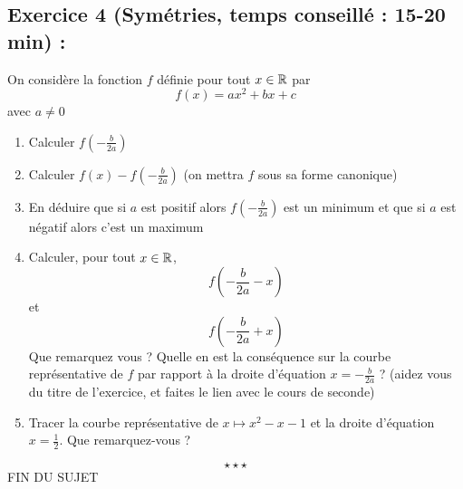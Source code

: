 \subsection*{Exercice 4 (Symétries, temps conseillé : 15-20 min) : }
On considère la fonction $f$ définie pour tout $x\in \mathbb{R}$ par 
$$f(x) = ax^2+bx+c$$
avec $a\neq 0$
\begin{enumerate}
\item Calculer $\displaystyle f\left(-\frac{b}{2a}\right)$
\item Calculer $f(x) - f\left(-\frac{b}{2a}\right)$ (on mettra $f$ sous sa forme canonique)
\item En déduire que si $a$ est positif alors $f\left(-\frac{b}{2a}\right)$ est un minimum et que si $a$ est négatif alors c'est un maximum
\item Calculer, pour tout $x\in \mathbb{R}$, $$f\left(-\frac{b}{2a} - x\right)$$ et $$f\left(-\frac{b}{2a} + x\right)$$ Que remarquez vous ? Quelle en est la conséquence sur la courbe représentative de $f$ par rapport à la droite d'équation $x = -\frac{b}{2a}$ ? (aidez vous du titre de l'exercice, et faites le lien avec le cours de seconde)
\item Tracer la courbe représentative de $x\mapsto x^2-x-1$ et la droite d'équation $x=\frac{1}{2}$. Que remarquez-vous ?
\end{enumerate}
$$\star \star \star$$
\center
FIN DU SUJET
